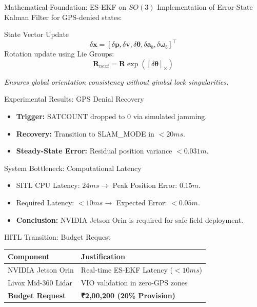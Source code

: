 \documentclass{beamer}
\begin{document}
\begin{frame}{Mathematical Foundation: ES-EKF on $SO(3)$}
    Implementation of Error-State Kalman Filter for GPS-denied states:
    \begin{block}{State Vector Update}
        $$\delta \mathbf{x} = [\delta \mathbf{p}, \delta \mathbf{v}, \delta \boldsymbol{\theta}, \delta \mathbf{a}_b, \delta \boldsymbol{\omega}_b]^\top$$
        Rotation update using Lie Groups:
        $$\mathbf{R}_{next} = \mathbf{R} \exp([\delta \boldsymbol{\theta}]_\times)$$
    \end{block}
    \textit{Ensures global orientation consistency without gimbal lock singularities.}
\end{frame}

\begin{frame}{Experimental Results: GPS Denial Recovery}
    \begin{itemize}
        \item \textbf{Trigger:} SATCOUNT dropped to 0 via simulated jamming.
        \item \textbf{Recovery:} Transition to SLAM\_MODE in $<20ms$.
        \item \textbf{Steady-State Error:} Residual position variance $<0.031m$.
    \end{itemize}
\end{frame}

\begin{frame}{System Bottleneck: Computational Latency}
    \begin{itemize}
        \item SITL CPU Latency: $24ms \rightarrow$ Peak Position Error: $0.15m$.
        \item Required Latency: $<10ms \rightarrow$ Expected Error: $<0.05m$.
        \item \textbf{Conclusion:} NVIDIA Jetson Orin is required for safe field deployment.
    \end{itemize}
\end{frame}

\begin{frame}{HITL Transition: Budget Request}
    \begin{table}[]
        \begin{tabular}{|l|l|}
        \hline
        \textbf{Component} & \textbf{Justification} \\ \hline
        NVIDIA Jetson Orin & Real-time ES-EKF Latency ($<10ms$) \\ \hline
        Livox Mid-360 Lidar & VIO validation in zero-GPS zones \\ \hline
        \textbf{Budget Request} & \textbf{₹2,00,200 (20\% Provision)} \\ \hline
        \end{tabular}
    \end{table}
\end{frame}
\end{document}
